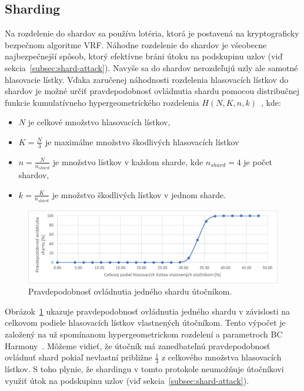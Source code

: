 \subsection{Sharding}
Na rozdelenie do shardov sa používa lotéria, ktorá je postavená na kryptograficky bezpečnom algoritme VRF. Náhodne rozdelenie do shardov je všeobecne najbezpečnejší spôsob, ktorý efektívne bráni útoku na podskupinu uzlov (viď sekcia~\ref{subsec:shard-attack}). Navyše sa do shardov nerozdeľujú uzly ale samotné hlasovacie lístky. Vďaka zaručenej náhodnosti rozdelenia hlasovacích lístkov do shardov je možné určiť pravdepodobnosť ovládnutia shardu pomocou distribučnej funkcie kumulatívneho hypergeometrického rozdelenia $H(N,K,n,k)$~\cite{rice2006mathematical, harmonyWp}, kde:
\begin{itemize}
	\item $N$ je celkové množstvo hlasovacích lístkov,
	\item $K = \frac{N}{3}$ je maximálne množstvo škodlivých hlasovacích lístkov
	\item $n = \frac{N}{n_{shard}}$ je množstvo lístkov v každom sharde, kde $n_{shard} = 4$ je počet shardov,
	\item $k = \frac{K}{n_{shard}}$ je množstvo škodlivých lístkov v jednom sharde.
\end{itemize}

\begin{figure}[bt]
	\centering
	\includegraphics[width=\textwidth]{obrazky-figures/hypergeom-dist}
	\caption{Pravdepodobnosť ovládnutia jedného shardu útočníkom.}
	\label{img:hypergeom-dist}
\end{figure}

Obrázok~\ref{img:hypergeom-dist} ukazuje pravdepodobnosť ovládnutia jedného shardu v závislosti na celkovom podiele hlasovacích lístkov vlastnených útočníkom. Tento výpočet je založený na už spomínanom hypergeometrickom rozdelení a parametroch BC Harmony~\cite{harmonyWp}. Môžeme vidieť, že útočník má zanedbateľnú pravdepodobnosť ovládnuť shard pokiaľ nevlastní približne $\frac{1}{3}$ z celkového množstva hlasovacích lístkov. S toho plynie, že shardingu v tomto protokole neumožňuje útočníkovi využiť útok na podskupinu uzlov (viď sekcia~\ref{subsec:shard-attack}).

